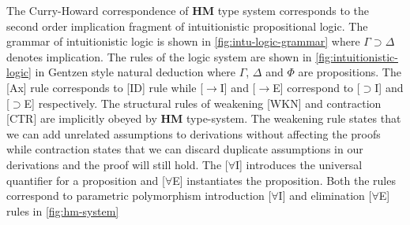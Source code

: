 The Curry-Howard correspondence of \textbf{HM} type system
corresponds to the second order implication fragment of intuitionistic propositional logic.
The grammar of intuitionistic logic is shown in \cref{fig:intu-logic-grammar} where $\Gamma \supset \Delta$ denotes implication.
The rules of the logic system are shown in \cref{fig:intuitionistic-logic} in Gentzen style natural deduction
where $\Gamma$, $\Delta$ and $\Phi$ are propositions. The [Ax] rule corresponds to [ID] rule while [$\rightarrow$I] and [$\rightarrow$E] correspond
to [$\supset$I] and [$\supset$E] respectively. The structural rules of weakening [WKN] and contraction [CTR] are implicitly obeyed
by \textbf{HM} type-system. The weakening rule states that we can add unrelated assumptions to derivations without
affecting the proofs while contraction states that we can discard duplicate assumptions in our derivations and the
proof will still hold. The [$\forall$I] introduces the universal quantifier for a proposition and [$\forall$E] instantiates
the proposition. Both the rules correspond to parametric polymorphism introduction [$\forall$I] and elimination [$\forall$E] rules in \cref{fig:hm-system}

